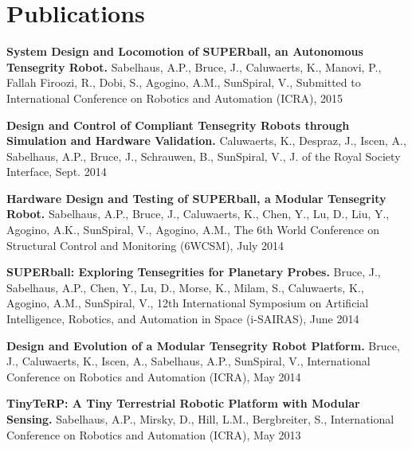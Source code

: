 \documentclass[letterpaper]{deedy-resume} %
\begin{document}
\begin{minipage}[t]{0.66\textwidth}%
\section{Publications}

\vspace{0.4cm}

\begin{tightitemize}

\item \textbf{System Design and Locomotion of SUPERball, an Autonomous Tensegrity Robot.} Sabelhaus, A.P., Bruce, J., Caluwaerts, K., Manovi, P., Fallah Firoozi, R., Dobi, S., Agogino, A.M., SunSpiral, V., Submitted to International Conference on Robotics and Automation (ICRA), 2015

\item \textbf{Design and Control of Compliant Tensegrity Robots through Simulation and Hardware Validation.} Caluwaerts, K., Despraz, J., Iscen, A., Sabelhaus, A.P., Bruce, J., Schrauwen, B., SunSpiral, V.,  J. of the Royal Society Interface, Sept. 2014

\item \textbf{Hardware Design and Testing of SUPERball, a Modular Tensegrity Robot.} Sabelhaus, A.P., Bruce, J., Caluwaerts, K., Chen, Y., Lu, D., Liu, Y., Agogino, A.K., SunSpiral, V., Agogino, A.M., The 6th World Conference on Structural Control and Monitoring (6WCSM), July 2014

\item \textbf{SUPERball: Exploring Tensegrities for Planetary Probes.} Bruce, J., Sabelhaus, A.P., Chen, Y., Lu, D., Morse, K., Milam, S., Caluwaerts, K., Agogino, A.M., SunSpiral, V., 12th International Symposium on Artificial Intelligence, Robotics, and Automation in Space (i-SAIRAS), June 2014

\item \textbf{Design and Evolution of a Modular Tensegrity Robot Platform.} Bruce, J., Caluwaerts, K., Iscen, A., Sabelhaus, A.P., SunSpiral, V., International Conference on Robotics and Automation (ICRA), May 2014

\item \textbf{TinyTeRP: A Tiny Terrestrial Robotic Platform with Modular Sensing.} Sabelhaus, A.P., Mirsky, D., Hill, L.M., Bergbreiter, S., International Conference on Robotics and Automation (ICRA), May 2013 


\end{tightitemize}
\end{minipage}
\end{document}
